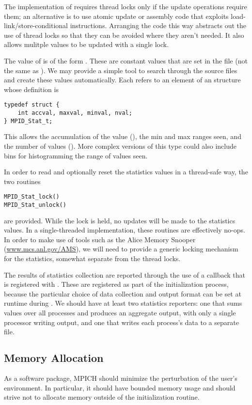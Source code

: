 \documentclass{article}
\begin{document}
The implementation of  requires thread locks
only if the update operations require 
them; an alternative is to use atomic update or assembly code that
exploits load-link/store-conditional instructions.  Arranging the code
this way abstracts out the use of thread locks so that they can be
avoided where they aren't needed.  It also allows mulitple 
values to be updated with a single lock.

The value of  is of the form .  These are
constant values that are set in the file  (not the
same as ).  We may provide a
simple tool to search through the source files and create these values
automatically.  Each  refers to an element of an
 structure whose definition is
\begin{verbatim}
typedef struct {
    int accval, maxval, minval, nval;
} MPID_Stat_t;
\end{verbatim}
This allows the accumulation of the value (), the min and max
ranges seen, and the number of values ().  More complex versions of
this type could also include bins for histogramming the range of values seen.

In order to read and optionally reset the statistics values in a thread-safe
way, the two routines
\begin{verbatim}
MPID_Stat_lock()
MPID_Stat_unlock()
\end{verbatim}
are provided.  While the lock is held, no updates will be made to the
statistics values.  In a single-threaded implementation, these routines are
effectively no-ops.  
In order to make use of tools such as the Alice Memory Snooper
(\url{www.mcs.anl.gov/AMS}), we will need to provide a generic locking
mechanism for the statistics, somewhat separate from the thread locks.  

The results of statistics collection are reported through the use of a
callback that is registered with .  These are
registered as part of the initialization process, because the
particular choice of data collection and output format can be set at
runtime during .  We should have at least two
statistics reporters: one that sums values over all processes and
produces an aggregate output, with only a single processor writing
output, and one that writes each process's data to a separate file.

\subsection{Memory Allocation}
As a software package, MPICH should minimize the perturbation of the user's
environment.  In 
particular, it should have bounded memory usage and should strive not to
allocate memory outside of the initialization routine.  
\end{document}
